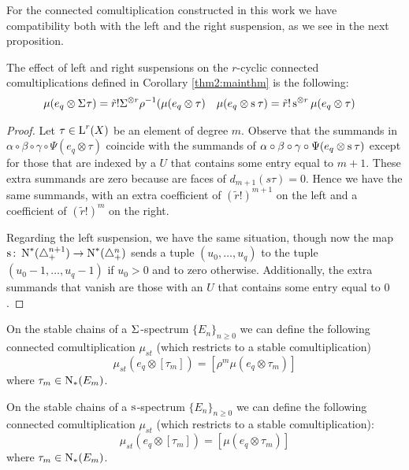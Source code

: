 For the connected comultiplication constructed in this work we have compatibility both with the left and the right suspension, as we see in the next proposition.




\begin{proposition}\label{prop:suspensionconnected}
    The effect of left and right suspensions on the $r$-cyclic connected comultiplications defined in Corollary \ref{thm2:mainthm} is the following:
    \begin{align*}
       \mu(e_q\otimes \Sigma^{}\tau) &= \tilde{r}!\Sigma^{\otimes r}\rho^{-1}(\mu(e_q\otimes \tau) &
       \mu(e_q\otimes \operatorname{s}^{}\tau) &= \tilde{r}!\operatorname{s}^{\otimes r}\mu(e_q\otimes \tau)
    \end{align*}
\end{proposition}
\begin{proof}
    Let $\tau\in \operatorname{L}^r(X)$ be an element of degree $m$. Observe that the summands in $\alpha\circ\beta\circ\gamma\circ \Psi(e_q\otimes \tau)$ coincide with the summands of $\alpha\circ\beta\circ\gamma\circ \Psi(e_q\otimes \operatorname{s}^{}\tau)$ except for those that are indexed by a $U$ that contains some entry equal to $m+1$. These extra summands are zero because are faces of $d_{m+1}(s{} \tau) = 0$. Hence we have the same summands, with an extra coefficient of $(\tilde{r}!)^{m+1}$ on the left and a coefficient of $(\tilde{r}!)^m$ on the right. 

    Regarding the left suspension, we have the same situation, though now the map $\operatorname{s}^{}\colon \operatorname{N}^*(\triangle_{+}^{n+1})\to \operatorname{N}^*(\triangle_{+}^{n})$ sends a tuple $(u_0,\ldots,u_q)$ to the tuple $(u_0-1,\ldots,u_q-1)$ if $u_0>0$ and to zero otherwise. Additionally, the extra summands that vanish are those with an $U$ that contains some entry equal to $0$.  
\end{proof}

\begin{corollary}
    On the stable chains of a $\Sigma^{}$-spectrum $\{E_n\}_{n\geq 0}$ we can define the following connected comultiplication $\mu_{st}$ (which restricts to a stable comultiplication)
    \[
        \mu_{st}(e_q\otimes [\tau_m]) = [\rho^m \mu(e_q\otimes \tau_m)]
    \]
    where $\tau_m\in \operatorname{N}_*(E_m)$.
\end{corollary}
\begin{corollary}
    On the stable chains of a $\operatorname{s}^{}$-spectrum $\{E_n\}_{n\geq 0}$ we can define the following connected comultiplication $\mu_{st}$ (which restricts to a stable comultiplication):
    \[
        \mu_{st}(e_q\otimes [\tau_m]) = [\mu(e_q\otimes \tau_m)]
    \]
    where $\tau_m\in\operatorname{N}_*(E_m)$.
\end{corollary}



